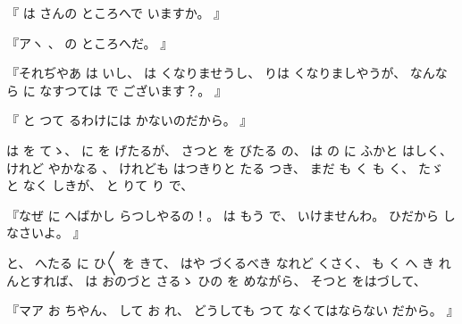 %
『
は
さんの
ところへで
いますか。
』

%
『アヽ
、
%
の
ところへだ。
』

%
『それぢやあ
は
いし、
%
は
くなりませうし、
%
りは
くなりましやうが、
%
なんなら
に
なすつては
で
ございます？。
』

%
『
と
つて
るわけには
かないのだから。
』

%
は
を
てゝ、
%
に
を
げたるが、
%
さつと
を
びたる
の、
%
は
の
に
ふかと
はしく、
%
けれど
やかなる
、
%
けれども
はつきりと
たる
つき、
%
まだ
も
く
も
く、
%
たゞ
と
なく
しきが、
%
と
りて
り
で、

%
『なぜ
に
へばかし
らつしやるの！。
%
は
もう
で、
%
いけませんわ。
%
ひだから
しなさいよ。
』

%
と、
%
へたる
に
ひ〳〵
を
きて、
%
はや
づくるべき
なれど
くさく、
%
も
く
へ
き
れんとすれば、
%
は
おのづと
さるゝ
ひの
を
めながら、
%
そつと
をはづして、

%
『マア
お
ちやん、
%
して%
お
れ、
%
どうしても
つて
なくてはならない
だから。
』

